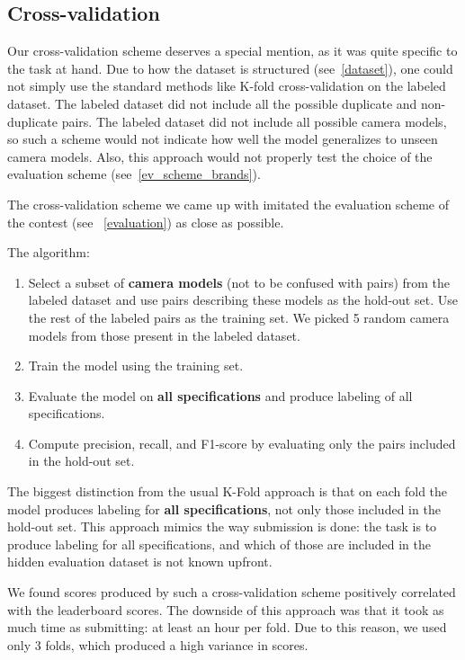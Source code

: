 \documentclass[sigconf]{acmart}
\begin{document}
\subsection{Cross-validation}

Our cross-validation scheme deserves a special mention, as it was quite specific to the task at hand. Due to how the dataset is structured (see~\ref{dataset}), one could not simply use the standard methods like K-fold cross-validation on the labeled dataset. The labeled dataset did not include all the possible duplicate and non-duplicate pairs. The labeled dataset did not include all possible camera models, so such a scheme would not indicate how well the model generalizes to unseen camera models. Also, this approach would not properly test the choice of the evaluation scheme (see~\ref{ev_scheme_brands}). 

The cross-validation scheme we came up with imitated the evaluation scheme of the contest (see ~\ref{evaluation}) as close as possible. 

The algorithm:
\begin{enumerate}
\item Select a subset of \textbf{camera models} (not to be confused with pairs) from the labeled dataset and use pairs describing these models as the hold-out set. Use the rest of the labeled pairs as the training set. We picked 5 random camera models from those present in the labeled dataset. 
\item Train the model using the training set.
\item Evaluate the model on \textbf{all specifications} and produce labeling of all specifications.
\item Compute precision, recall, and F1-score by evaluating only the pairs included in the hold-out set.
\end{enumerate}

The biggest distinction from the usual K-Fold approach is that on each fold the model produces labeling for \textbf{all specifications}, not only those included in the hold-out set. This approach mimics the way submission is done: the task is to produce labeling for all specifications, and which of those are included in the hidden evaluation dataset is not known upfront. 

We found scores produced by such a cross-validation scheme positively correlated with the leaderboard scores. The downside of this approach was that it took as much time as submitting: at least an hour per fold. Due to this reason, we used only 3 folds, which produced a high variance in scores.
\end{document}
